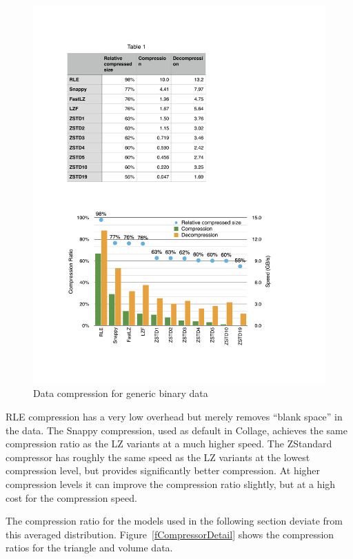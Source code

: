 \documentclass[10pt,journal,compsoc]{IEEEtran}
\newcommand{\fig}[1]{Figure~\ref{#1}}
\begin{document}
\begin{figure}[ht]\center
  \includegraphics[width=\columnwidth]{images/compressor}
  \caption{\label{fCompressor}Data compression for generic binary data}
\end{figure}

RLE compression has a very low overhead but merely removes ``blank space'' in
the data. The Snappy compression, used as default in \textsf{Collage}, achieves
the same compression ratio as the LZ variants at a much higher speed. The
ZStandard compressor has roughly the same speed as the LZ variants at the lowest
compression level, but provides significantly better compression. At higher
compression levels it can improve the compression ratio slightly, but at a high
cost for the compression speed.

The compression ratio for the models used in the following section deviate from
this averaged distribution. \fig{fCompressorDetail} shows the compression ratios
for the triangle and volume data.
\end{document}
